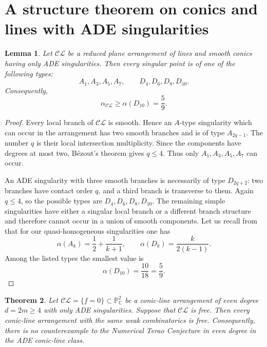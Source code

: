 \documentclass[11pt]{article}
\newtheorem{theorem}{Theorem}[section]
\newtheorem{lemma}[theorem]{Lemma}
\theoremstyle{remark}
\begin{document}
\section{A structure theorem on conics and lines with ADE singularities}

\begin{lemma}\label{lem:types}
Let $\mathcal{CL}$ be a reduced plane arrangement of lines and smooth conics having only ADE singularities.  Then every singular point is of one of the following types:
\[
 A_1,A_3,A_5,A_7,\qquad D_4,D_6,D_8,D_{10}.
\]
Consequently,
\[
 \alpha_{\mathcal{CL}}\ge \alpha(D_{10})=\frac59.
\]
\end{lemma}

\begin{proof}
Every local branch of $\mathcal{CL}$ is smooth.  Hence an $A$-type singularity
which can occur in the arrangement has two smooth branches and is of type
$A_{2q-1}$.  The number $q$ is their local intersection multiplicity.  Since
the components have degrees at most two, B\'ezout's theorem gives $q\le4$.
Thus only $A_1,A_3,A_5,A_7$ can occur.

An ADE singularity with three smooth branches is necessarily of type
$D_{2q+2}$: two branches have contact order $q$, and a third branch is
transverse to them.  Again $q\le4$, so the possible types are
$D_4,D_6,D_8,D_{10}$.  The remaining simple singularities have either a
singular local branch or a different branch structure and therefore cannot occur in a union of smooth components. Let us recall from \cite{DimcaSernesi} that for our quasi-homogeneous singularities one has
\[
 \alpha(A_k)=\frac12+\frac1{k+1},
 \qquad
 \alpha(D_k)=\frac{k}{2(k-1)}.
\]
Among the listed types the smallest value is
\[
 \alpha(D_{10})=\frac{10}{18}=\frac59.
\]
\end{proof}

\begin{theorem}\label{thm:even}
Let $\mathcal{CL} = \{f=0\} \subset \mathbb{P}^{2}_{\mathbb{C}}$ be a conic-line arrangement of even degree
$d=2m\ge4$ with only ADE singularities.  Suppose that $\mathcal{CL}$ is free. Then every conic-line arrangement with the same weak combinatorics is free. Consequently, there is no counterexample to the Numerical Terao Conjecture in even degree in the ADE conic-line class.
\end{theorem}
\end{document}
